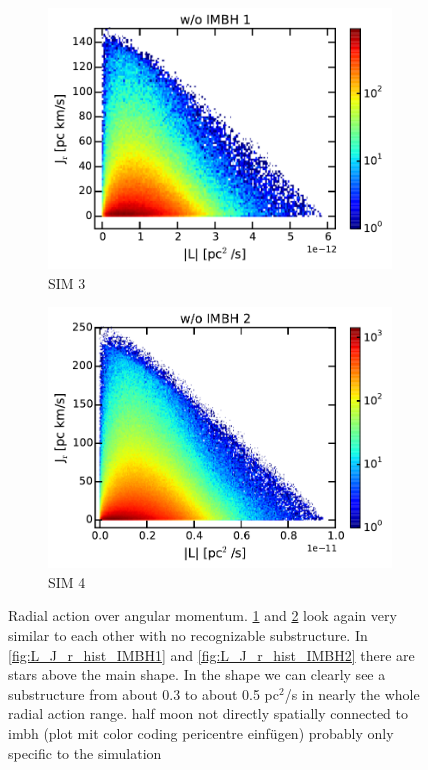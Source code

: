 \begin{figure}[htbp]
\begin{subfigure}{0.475\textwidth}
		\includegraphics[width=\textwidth]{Plots/L_J_r_hist_noIMBH1.pdf}
		\caption{SIM 3}
		\label{fig:L_J_r_hist_noIMBH1}
	\end{subfigure}
	\hfill
	\begin{subfigure}{0.475\textwidth}
		\includegraphics[width=\textwidth]{Plots/L_J_r_hist_noIMBH2.pdf}
		\caption{SIM 4}
		\label{fig:L_J_r_hist_noIMBH2}
	\end{subfigure}
	\caption{Radial action over angular momentum. \ref{fig:L_J_r_hist_noIMBH1} and \ref{fig:L_J_r_hist_noIMBH2} look again very similar to each other with no recognizable substructure. In \ref{fig:L_J_r_hist_IMBH1} and \ref{fig:L_J_r_hist_IMBH2} there are stars above the main shape. In the shape we can clearly see a substructure from about 0.3 to about 0.5 pc\(^2\)/s in nearly the whole radial action range. \color{red}half moon not directly spatially connected to imbh (plot mit color coding pericentre einfügen) probably only specific to the simulation\color{black}}
	\label{fig:L_J_r_hist}
\end{figure}

